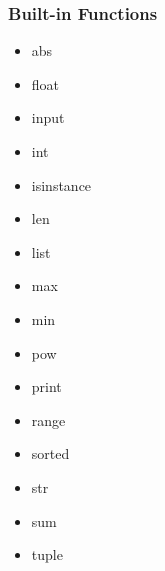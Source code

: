 \documentclass[11pt]{article}
\begin{document}
\subsubsection{Built-in Functions}
\vspace{-0.6cm}
\begin{multicols}{4}
  \begin{itemize}
      \item abs
      \item float
      \item input
      \item int
      \item isinstance
      \item len
      \item list
      \item max
      \item min
      \item pow
      \item print
      \item range
      \item sorted
      \item str
      \item sum
      \item tuple
  \end{itemize}
\end{multicols}
\vspace{-0.7cm}
\end{document}
